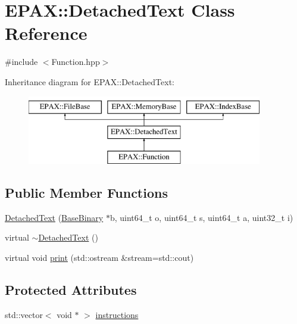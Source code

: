 \hypertarget{class_e_p_a_x_1_1_detached_text}{\section{\-E\-P\-A\-X\-:\-:\-Detached\-Text \-Class \-Reference}
\label{class_e_p_a_x_1_1_detached_text}
}


{\ttfamily \#include $<$\-Function.\-hpp$>$}

\-Inheritance diagram for \-E\-P\-A\-X\-:\-:\-Detached\-Text\-:\begin{figure}[H]
\begin{center}
\leavevmode
\includegraphics[height=3.000000cm]{class_e_p_a_x_1_1_detached_text}
\end{center}
\end{figure}
\subsection*{\-Public \-Member \-Functions}
\begin{DoxyCompactItemize}
\item 
\hyperlink{class_e_p_a_x_1_1_detached_text_ae79447b52406259983750894d291dcef}{\-Detached\-Text} (\hyperlink{class_e_p_a_x_1_1_base_binary}{\-Base\-Binary} $\ast$b, uint64\-\_\-t o, uint64\-\_\-t s, uint64\-\_\-t a, uint32\-\_\-t i)
\item 
virtual \hyperlink{class_e_p_a_x_1_1_detached_text_ac55a477e1fbdb7ed76f148c56fd782df}{$\sim$\-Detached\-Text} ()
\item 
virtual void \hyperlink{class_e_p_a_x_1_1_detached_text_a8a32ccd60ccd9a710a84301b4c483902}{print} (std\-::ostream \&stream=std\-::cout)
\end{DoxyCompactItemize}
\subsection*{\-Protected \-Attributes}
\begin{DoxyCompactItemize}
\item 
std\-::vector$<$ void $\ast$ $>$ \hyperlink{class_e_p_a_x_1_1_detached_text_afd3624b03921f90ff4c2cd2a1d172e76}{instructions}
\end{DoxyCompactItemize}


